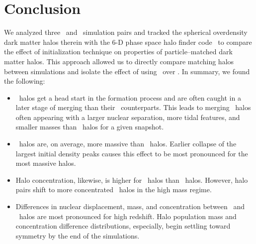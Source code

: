 \section{Conclusion}
\label{sec:conclusion}

We analyzed three \lpt\ and \za\ simulation pairs and tracked the spherical overdensity dark matter halos therein with the 6-D phase space halo finder code \rockstar\ to compare the effect of initialization technique on properties of particle--matched dark matter halos.  This approach allowed us to directly compare matching halos between simulations and isolate the effect of using \lpt\ over \za.  In summary, we found the following:

\begin{itemize}
	\item \lpt\ halos get a head start in the formation process and are often caught in a later stage of merging than their \za\ counterparts.  This leads to merging \za\ halos often appearing with a larger nuclear separation, more tidal features, and smaller masses than \lpt\ halos for a given snapshot.
	\item \lpt\ halos are, on average, more massive than \za\ halos.  Earlier collapse of the largest initial density peaks causes this effect to be most pronounced for the most massive halos.
	\item Halo concentration, likewise, is higher for \lpt\ halos than \za\ halos.  However, halo pairs shift to more concentrated \za\ halos in the high mass regime.
	\item Differences in nuclear displacement, mass, and concentration between \lpt\ and \za\ halos are most pronounced for high redshift.  Halo population mass and concentration difference distributions, especially, begin settling toward symmetry by the end of the simulations.
\end{itemize}

